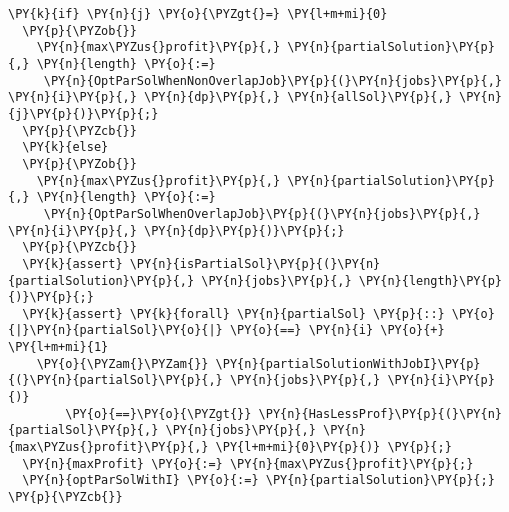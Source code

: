 \begin{Verbatim}[commandchars=\\\{\}, fontsize=\footnotesize]
  \PY{k}{if} \PY{n}{j} \PY{o}{\PYZgt{}=} \PY{l+m+mi}{0} 
  \PY{p}{\PYZob{}}
    \PY{n}{max\PYZus{}profit}\PY{p}{,} \PY{n}{partialSolution}\PY{p}{,} \PY{n}{length} \PY{o}{:=}
     \PY{n}{OptParSolWhenNonOverlapJob}\PY{p}{(}\PY{n}{jobs}\PY{p}{,} \PY{n}{i}\PY{p}{,} \PY{n}{dp}\PY{p}{,} \PY{n}{allSol}\PY{p}{,} \PY{n}{j}\PY{p}{)}\PY{p}{;}
  \PY{p}{\PYZcb{}}
  \PY{k}{else}
  \PY{p}{\PYZob{}}
    \PY{n}{max\PYZus{}profit}\PY{p}{,} \PY{n}{partialSolution}\PY{p}{,} \PY{n}{length} \PY{o}{:=}
     \PY{n}{OptParSolWhenOverlapJob}\PY{p}{(}\PY{n}{jobs}\PY{p}{,} \PY{n}{i}\PY{p}{,} \PY{n}{dp}\PY{p}{)}\PY{p}{;}
  \PY{p}{\PYZcb{}}
  \PY{k}{assert} \PY{n}{isPartialSol}\PY{p}{(}\PY{n}{partialSolution}\PY{p}{,} \PY{n}{jobs}\PY{p}{,} \PY{n}{length}\PY{p}{)}\PY{p}{;}
  \PY{k}{assert} \PY{k}{forall} \PY{n}{partialSol} \PY{p}{::} \PY{o}{|}\PY{n}{partialSol}\PY{o}{|} \PY{o}{==} \PY{n}{i} \PY{o}{+} \PY{l+m+mi}{1} 
    \PY{o}{\PYZam{}\PYZam{}} \PY{n}{partialSolutionWithJobI}\PY{p}{(}\PY{n}{partialSol}\PY{p}{,} \PY{n}{jobs}\PY{p}{,} \PY{n}{i}\PY{p}{)}
        \PY{o}{==}\PY{o}{\PYZgt{}} \PY{n}{HasLessProf}\PY{p}{(}\PY{n}{partialSol}\PY{p}{,} \PY{n}{jobs}\PY{p}{,} \PY{n}{max\PYZus{}profit}\PY{p}{,} \PY{l+m+mi}{0}\PY{p}{)} \PY{p}{;}
  \PY{n}{maxProfit} \PY{o}{:=} \PY{n}{max\PYZus{}profit}\PY{p}{;}
  \PY{n}{optParSolWithI} \PY{o}{:=} \PY{n}{partialSolution}\PY{p}{;}
\PY{p}{\PYZcb{}}
\end{Verbatim}

